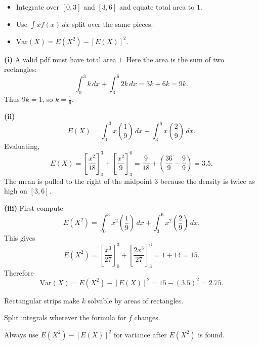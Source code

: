 \begin{hint}
\begin{itemize}[leftmargin=*]
  \item Integrate over $[0,3]$ and $[3,6]$ and equate total area to $1$.
  \item Use $\int x f(x)\,dx$ split over the same pieces.
  \item $\mathrm{Var}(X)=E(X^2)-[E(X)]^2$.
\end{itemize}
\end{hint}

\begin{solution}
\textbf{(i)} A valid pdf must have total area $1$. Here the area is the sum of two rectangles:
\[
\int_0^3 k\,dx+\int_3^6 2k\,dx=3k+6k=9k.
\]
Thus $9k=1$, so $k=\frac19$.

\textbf{(ii)}
\[
E(X)=\int_0^{3}x\left(\frac{1}{9}\right)\,dx+\int_3^{6}x\left(\frac{2}{9}\right)\,dx.
\]
Evaluating,
\[
E(X)=\left[\frac{x^2}{18}\right]_0^3+\left[\frac{x^2}{9}\right]_3^6
=\frac{9}{18}+\left(\frac{36}{9}-\frac{9}{9}\right)=3{.}5.
\]
The mean is pulled to the right of the midpoint $3$ because the density is twice as high on $[3,6]$.

\textbf{(iii)} First compute
\[
E(X^{2})=\int_0^{3}x^{2}\left(\frac{1}{9}\right)\,dx+\int_3^{6}x^{2}\left(\frac{2}{9}\right)\,dx.
\]
This gives
\[
E(X^2)=\left[\frac{x^3}{27}\right]_0^3+\left[\frac{2x^3}{27}\right]_3^6=1+14=15.
\]
Therefore
\[
\mathrm{Var}(X)=E(X^2)-[E(X)]^2=15-(3{.}5)^2=\boxed{2{.}75}.
\]
\end{solution}

\begin{takeaways}
\item Rectangular strips make $k$ solvable by areas of rectangles.
\item Split integrals wherever the formula for $f$ changes.
\item Always use $E(X^{2})-[E(X)]^{2}$ for variance after $E(X^{2})$ is found.
\end{takeaways}
